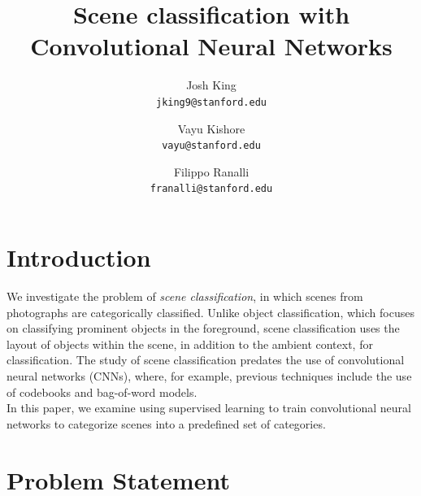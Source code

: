 \documentclass[10pt,twocolumn,letterpaper]{article}
\begin{document}
\title{Scene classification with Convolutional Neural Networks}

\author{Josh King\\
{\tt\small jking9@stanford.edu}
\and
Vayu Kishore\\
{\tt\small vayu@stanford.edu}
\and Filippo Ranalli\\
{\tt\small franalli@stanford.edu}
}

\maketitle


\section{Introduction}

We investigate the problem of \textit{scene classification}, in which scenes
from photographs are categorically classified. Unlike object classification, which
focuses on classifying prominent objects in the foreground, scene
classification uses the layout of objects within the scene, in addition to the
ambient context, for classification. The study of scene classification predates
the use of convolutional neural networks (CNNs), where, for example, previous
techniques include the use of
codebooks and bag-of-word models.\cite{Rasiwasia}\\

In this paper, we examine using supervised learning to train convolutional
neural networks to categorize scenes into a predefined set of categories.\\


\section{Problem Statement}
\end{document}
